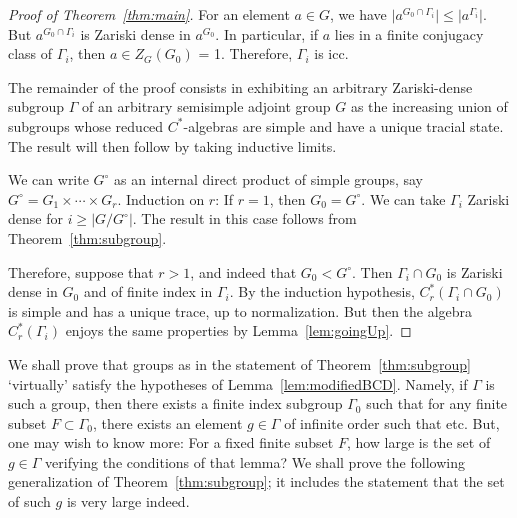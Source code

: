 \documentclass{amsart}
\theoremstyle{plain}
\theoremstyle{definition}
\theoremstyle{remark}
\providecommand{\abs}[1]{\lvert#1\rvert}
\begin{document}
\begin{proof}[Proof of Theorem~\ref{thm:main}]
For an element $a \in G$, we have $\abs{a^{G_{0} \cap \Gamma_{i}}} \leqslant
\abs{a^{\Gamma_{i}}}$. But $a^{G_{0} \cap \Gamma_{i}}$ is Zariski dense in $a^{G_{0}}$.
In particular, if $a$ lies in a finite conjugacy class of $\Gamma_{i}$, then $a \in
Z_{G}(G_{0})$ = 1. Therefore, $\Gamma_{i}$ is icc.

The remainder of the proof consists in exhibiting an arbitrary Zariski-dense subgroup
$\Gamma$ of an arbitrary semisimple adjoint group $G$ as the increasing union of
subgroups whose reduced $C^{*}$-algebras are simple and have a unique tracial state. The
result will then follow by taking inductive limits.

We can write $G^{\circ}$ as an internal direct product of simple groups, say $G^{\circ}
= G_{1} \times \cdots \times G_{r}$. Induction on $r$: If $r = 1$, then $G_{0} =
G^{\circ}$. We can take $\Gamma_{i}$ Zariski dense for $i \geqslant \abs{G/G^{\circ}}$.
The result in this case follows from Theorem~\ref{thm:subgroup}.

Therefore, suppose that $r > 1$, and indeed that $G_{0} < G^{\circ}$. Then $\Gamma_{i}
\cap G_{0}$ is Zariski dense in $G_{0}$ and of finite index in $\Gamma_{i}$. By the
induction hypothesis, $C_{r}^{*}(\Gamma_{i} \cap G_{0})$ is simple and has a unique
trace, up to normalization. But then the algebra $C_{r}^{*}(\Gamma_{i})$ enjoys the same
properties by Lemma~\ref{lem:goingUp}.
\end{proof}

We shall prove that groups as in the statement of Theorem~\ref{thm:subgroup} `virtually' satisfy the
hypotheses of Lemma~\ref{lem:modifiedBCD}. Namely, if $\Gamma$ is such a group, then there exists a finite index subgroup $\Gamma_{0}$ such that for any finite subset $F \subset \Gamma_{0}$, there
exists an element $g \in \Gamma$ of infinite order such that etc. But, one may wish to know
more: For a fixed finite subset $F$, how large is the set of $g \in \Gamma$ verifying
the conditions of that lemma? We shall prove the following generalization of
Theorem~\ref{thm:subgroup}; it includes the statement that the set of such $g$ is very
large indeed. 
\end{document}
